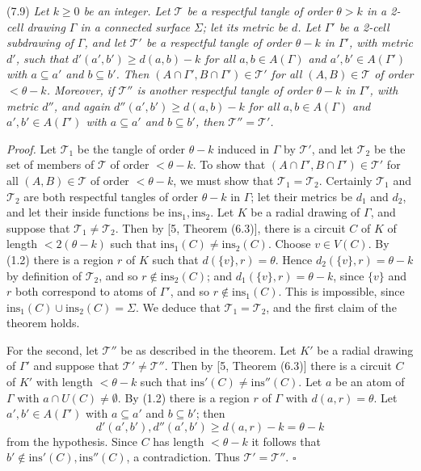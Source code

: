 \stmt
(7.9) \textit{Let $k \ge 0$ be an integer. Let $\mathscr{T}$ be a respectful tangle of order $\theta > k$ in a 2-cell drawing $\Gamma$ in a connected surface $\Sigma$; let its metric be $d$. Let $\Gamma'$ be a 2-cell subdrawing of $\Gamma$, and let $\mathscr{T}'$ be a respectful tangle of order $\theta - k$ in $\Gamma'$, with metric $d'$, such that $d'(a', b') \ge d(a, b) - k$ for all $a, b \in A(\Gamma)$ and $a', b' \in A(\Gamma')$ with $a \subseteq a'$ and $b \subseteq b'$. Then $(A \cap \Gamma', B \cap \Gamma') \in \mathscr{T}'$ for all $(A, B) \in \mathscr{T}$ of order $< \theta - k$. Moreover, if $\mathscr{T}''$ is another respectful tangle of order $\theta - k$ in $\Gamma'$, with metric $d''$, and again $d''(a', b') \ge d(a, b) - k$ for all $a, b \in A(\Gamma)$ and $a', b' \in A(\Gamma')$ with $a \subseteq a'$ and $b \subseteq b'$, then $\mathscr{T}'' = \mathscr{T}'$.}

\textit{Proof.} Let $\mathscr{T}_1$ be the tangle of order $\theta - k$ induced in $\Gamma$ by $\mathscr{T}'$, and let $\mathscr{T}_2$ be the set of members of $\mathscr{T}$ of order $< \theta - k$. To show that $(A \cap \Gamma', B \cap \Gamma') \in \mathscr{T}'$ for all $(A, B) \in \mathscr{T}$ of order $< \theta - k$, we must show that $\mathscr{T}_1 = \mathscr{T}_2$. Certainly $\mathscr{T}_1$ and $\mathscr{T}_2$ are both respectful tangles of order $\theta - k$ in $\Gamma$; let their metrics be $d_1$ and $d_2$, and let their inside functions be $\text{ins}_1, \text{ins}_2$. Let $K$ be a radial drawing of $\Gamma$, and suppose that $\mathscr{T}_1 \ne \mathscr{T}_2$. Then by [5, Theorem (6.3)], there is a circuit $C$ of $K$ of length $< 2(\theta - k)$ such that $\text{ins}_1(C) \ne \text{ins}_2(C)$. Choose $v \in V(C)$. By (1.2) there is a region $r$ of $K$ such that $d(\{v\}, r) = \theta$. Hence $d_2(\{v\}, r) = \theta - k$ by definition of $\mathscr{T}_2$, and so $r \notin \text{ins}_2(C)$; and $d_1(\{v\}, r) = \theta - k$, since $\{v\}$ and $r$ both correspond to atoms of $\Gamma'$, and so $r \notin \text{ins}_1(C)$. This is impossible, since $\text{ins}_1(C) \cup \text{ins}_2(C) = \Sigma$. We deduce that $\mathscr{T}_1 = \mathscr{T}_2$, and the first claim of the theorem holds.

For the second, let $\mathscr{T}''$ be as described in the theorem. Let $K'$ be a radial drawing of $\Gamma'$ and suppose that $\mathscr{T}' \ne \mathscr{T}''$. Then by [5, Theorem (6.3)] there is a circuit $C$ of $K'$ with length $< \theta - k$ such that $\text{ins}'(C) \ne \text{ins}''(C)$. Let $a$ be an atom of $\Gamma$ with $a \cap U(C) \ne \emptyset$. By (1.2) there is a region $r$ of $\Gamma$ with $d(a, r) = \theta$. Let $a', b' \in A(\Gamma')$ with $a \subseteq a'$ and $b \subseteq b'$; then
\begin{equation*}
d'(a', b'), d''(a', b') \ge d(a, r) - k = \theta - k
\end{equation*}
from the hypothesis. Since $C$ has length $< \theta - k$ it follows that $b' \notin \text{ins}'(C), \text{ins}''(C)$, a contradiction. Thus $\mathscr{T}' = \mathscr{T}''$. $\square$

